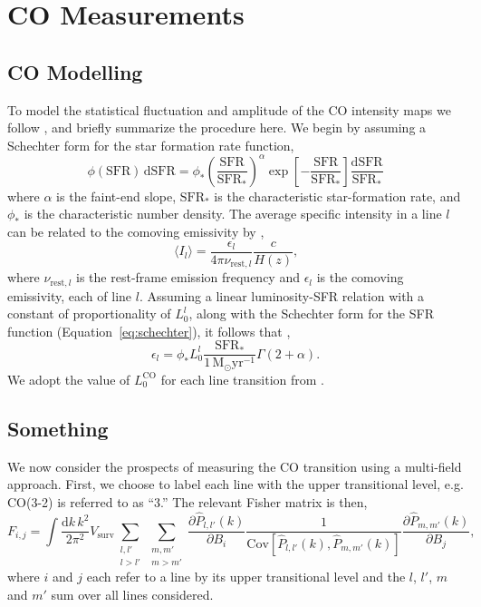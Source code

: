 \documentclass{aastex62}
\newcommand{\Msun}{\ensuremath{\text{M}_\odot}}
\newcommand{\SFR}{\ensuremath{\text{SFR}}}
\newcommand{\CO}{\ensuremath{\text{CO}}}
\newcommand{\beq}{\begin{equation}}
\newcommand{\eeq}{\end{equation}}
\newcommand{\Cov}[2]{\mathrm{Cov}[#1,#2]}
\newcommand{\avg}[1]{\ensuremath{\langle #1 \rangle}}
\begin{document}
\section{CO Measurements} \label{sec:co_measurements}
\subsection{CO Modelling} \label{ssec:co_modelling}
To model the statistical fluctuation and amplitude of the \CO{} intensity maps
we follow \citet{2016ApJ...825..143L}, and briefly summarize the procedure
here. We begin by assuming a Schechter form for the star formation rate
function,
\beq\label{eq:schechter}
\phi(\SFR)\,\text{d}\SFR = \phi_*
\left(\frac{\SFR}{\SFR_*}\right)^{\alpha}\exp{\left[-\frac{\SFR}{\SFR_*}\right]}
\frac{\text{d}\SFR}{\SFR_*}
\eeq
where $\alpha$ is the faint-end slope, $\SFR_*$ is the characteristic
star-formation rate, and $\phi_*$ is the characteristic number density. The
average specific intensity in a line $l$ can be related to the comoving
emissivity by \citep{2011ApJ...741...70L, 2013ApJ...768...15P},
\beq\label{eq:emiss_to_int}
\avg{I_l} = \frac{\epsilon_l}{4\pi \nu_{\text{rest},l}}\frac{c}{H(z)}\text{,}
\eeq
where $\nu_{\text{rest},l}$ is the rest-frame emission frequency and
$\epsilon_l$ is the comoving emissivity, each of line $l$. Assuming a linear
luminosity-SFR relation with a constant of proportionality of $L_0^l$, along
with the Schechter form for the SFR function (Equation~\ref{eq:schechter}), it
follows that \citep{2013ApJ...768...15P},
\beq\label{eq:com_emiss}
\epsilon_l = \phi_* L_0^{l}
\frac{\SFR_*}{1\,\Msun\text{yr}^{-1}}\Gamma{(2+\alpha)}\text{.}
\eeq
We adopt the value of $L_0^{\CO}$ for each line transition from
\citet{2010JCAP...11..016V}.

\subsection{Something} \label{ssec:co_}
We now consider the prospects of measuring the \CO{} transition using a
multi-field approach. First, we choose to label each line with the upper
transitional level, e.g. CO(3-2) is referred to as ``3.'' The relevant Fisher
matrix is then,
\beq\label{eq:co_fisher}
F_{i,j} = 
\int \frac{\text{d}k\,k^2}{2\pi^2} V_{\text{surv}} 
\sum_{\substack{l,l'\\l > l'}} \sum_{\substack{m,m'\\m > m'}}
\frac{\partial \hat{P}_{l,l'}(k)}{\partial B_i}
\frac{1}{\Cov{\hat{P}_{l,l'}(k)}{\hat{P}_{m,m'}(k)}} 
\frac{\partial \hat{P}_{m,m'}(k)}{\partial B_j}\text{,}
\eeq
where $i$ and $j$ each refer to a line by its upper transitional level and the
$l$, $l'$, $m$ and $m'$ sum over all lines considered.
\end{document}
